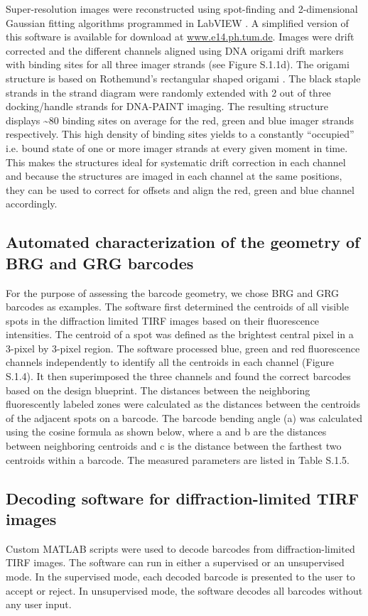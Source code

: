 Super-resolution images were reconstructed using spot-finding and 2-dimensional Gaussian fitting algorithms programmed in LabVIEW \citep{steinhauer_superresolution_2008}. A simplified version of this software is available for download at \url{www.e14.ph.tum.de}. Images were drift corrected and the different channels aligned using DNA origami drift markers with binding sites for all three imager strands (see Figure S.1.1d). The origami structure is based on Rothemund’s rectangular shaped origami	\citep{rothemund_folding_2006}. The black staple strands in the strand diagram were randomly extended with 2 out of three docking/handle strands for DNA-PAINT imaging. The resulting structure displays \textasciitilde80 binding sites on average for the red, green and blue imager strands respectively. This high density of binding sites yields to a constantly “occupied” i.e. bound state of one or more imager strands at every given moment in time. This makes the structures ideal for systematic drift correction in each channel and because the structures are imaged in each channel at the same positions, they can be used to correct for offsets and align the red, green and blue channel accordingly. 

\subsection{Automated characterization of the geometry of BRG and GRG barcodes}
For the purpose of assessing the barcode geometry, we chose BRG and GRG barcodes as examples. The software first determined the centroids of all visible spots in the diffraction limited TIRF images based on their fluorescence intensities. The centroid of a spot was defined as the brightest central pixel in a 3-pixel by 3-pixel region. The software processed blue, green and red fluorescence channels independently to identify all the centroids in each channel (Figure S.1.4). It then superimposed the three channels and found the correct barcodes based on the design blueprint. The distances between the neighboring fluorescently labeled zones were calculated as the distances between the centroids of the adjacent spots on a barcode. The barcode bending angle (a) was calculated using the cosine formula as shown below, where a and b are the distances between neighboring centroids and c is the distance between the farthest two centroids within a barcode. The measured parameters are listed in Table S.1.5.



\subsection{Decoding software for diffraction-limited TIRF images}\label{sec:dna_Methods:Matlab}
Custom MATLAB scripts were used to decode barcodes from diffraction-limited TIRF images. The software can run in either a supervised or an unsupervised mode. In the supervised mode, each decoded barcode is presented to the user to accept or reject. In unsupervised mode, the software decodes all barcodes without any user input.

